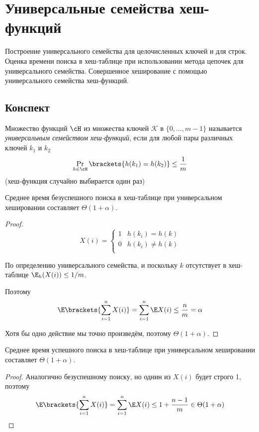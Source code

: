 \section{Универсальные семейства хеш-функций}
Построение универсального семейства для
целочисленных ключей и для строк.
Оценка времени поиска в хеш-таблице
при использовании метода цепочек для универсального семейства.
Совершенное хеширование с помощью
универсального семейства хеш-функций.

\subsection{Конспект}
Множество функций $\cH$
из множества ключей $\mathcal{K}$
в $\{0, \ldots, m - 1\}$
называется
\emph{универсальным семейством хеш-функций},
если для любой пары различных ключей
$k_1$ и $k_2$
\[ \Pr_{h \in \cH} \brackets{h(k_1) = h(k_2)} \le \frac{1}{m} \]
(хеш-функция случайно выбирается один раз)

\begin{theorem}
    Среднее время безуспешного поиска в хеш-таблице при
    универсальном хешировании составляет $\Theta(1 + \alpha)$.
\end{theorem}
\begin{proof}
    \[
        X(i) =
        \begin{cases}
            1 & h(k_i) = h(k) \\
            0 & h(k_i) \ne h(k) \\
        \end{cases}
    \]

    По определению универсального семейства,
    и поскольку $k$ отсутствует в хеш-таблице
    $\E_h(X(i)) \le 1 / m$.

    Поэтому
    \begin{gather*}
        \E \brackets{\sum_{i=1}^n X(i)}
        = \sum_{i=1}^n \E X(i)
        \le \frac{n}{m} = \alpha
    \end{gather*}

    Хотя бы одно действие мы точно произведём,
    поэтому $\Theta(1 + \alpha)$.
\end{proof}

\begin{theorem}
    Среднее время успешного поиска в хеш-таблице при
    универсальном хешировании составляет $\Theta(1 + \alpha)$.
\end{theorem}
\begin{proof}
    Аналогично безуспешному поиску,
    но однин из $X(i)$ будет строго 1,
    поэтому
    \begin{gather*}
        \E \brackets{\sum_{i=1}^n X(i)}
        = \sum_{i=1}^n \E X(i)
        \le 1 + \frac{n - 1}{m} \in \Theta(1 + \alpha)
    \end{gather*}
\end{proof}

